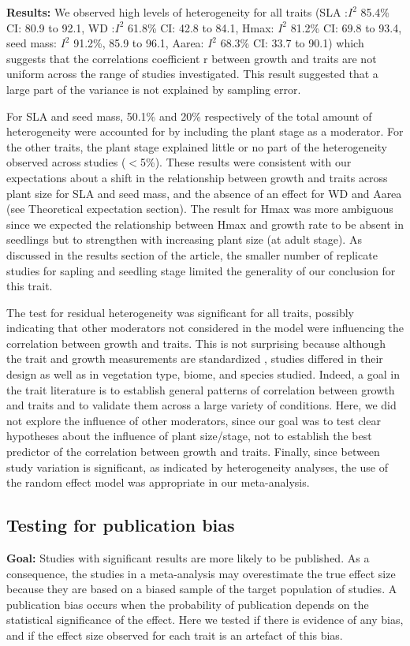 \documentclass[a4paper,11pt]{article}
\begin{document}
\begin{appendices}
\noindent\textbf{Results:} We observed high levels of heterogeneity for all traits (SLA :$I^{2}$ 85.4\% CI: 80.9 to 92.1, WD :$I^{2}$ 61.8\% CI: 42.8 to 84.1, Hmax: $I^{2}$ 81.2\% CI: 69.8 to 93.4, seed mass: $I^{2}$ 91.2\%, 85.9 to 96.1, Aarea: $I^{2}$ 68.3\% CI: 33.7 to 90.1) which suggests that the correlations coefficient r between growth and traits are not uniform across the range of studies investigated. This result suggested that a large part of the variance is not explained by sampling error.

For SLA and seed mass, 50.1\% and 20\% respectively of the total amount of heterogeneity were accounted for by including the plant stage as a moderator. For the other traits, the plant stage explained little or no part of the heterogeneity observed across studies ($<$5\%). These results were consistent with our expectations about a shift in the relationship between growth and traits across plant size for SLA and seed mass, and the absence of an effect for WD and Aarea (see Theoretical expectation section). The result for Hmax was more ambiguous since we expected the relationship between Hmax and growth rate to be absent in seedlings but to strengthen with increasing plant size (at adult stage). As discussed in the results section of the article, the smaller number of replicate studies for sapling and seedling stage limited the generality of our conclusion for this trait.

The test for residual heterogeneity was significant for all traits, possibly indicating that other moderators not considered in the model were influencing the correlation between growth and traits. This is not surprising because although the trait and growth measurements are standardized \citep{Cornelissen:2003gw}, studies differed in their design as well as in vegetation type, biome, and species studied. Indeed, a goal in the trait literature is to establish general patterns of correlation between growth and traits and to validate them across a large variety of conditions. Here, we did not explore the influence of other moderators, since our goal was to test clear hypotheses about the influence of plant size/stage, not to establish the best predictor of the correlation between growth and traits. Finally, since between study variation is significant, as indicated by heterogeneity analyses, the use of the random effect model was appropriate in our meta-analysis.

\subsection{Testing for publication bias}
\noindent\textbf{Goal:} Studies with significant results are more likely to be published. As a consequence, the studies in a meta-analysis may overestimate the true effect size because they are based on a biased sample of the target population of studies. A publication bias occurs when the probability of publication depends on the statistical significance of the effect. Here we tested if there is evidence of any bias, and if the effect size observed for each trait is an artefact of this bias.


\end{appendices}
\end{document}
